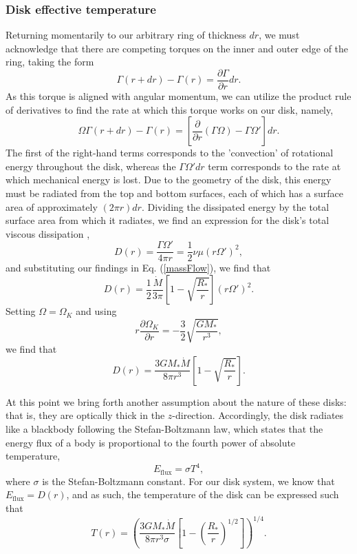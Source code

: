 \documentclass[aps,pra,twocolumn]{revtex4-1}
\begin{document}
\subsubsection{\label{section 2.2.2} Disk effective temperature}
Returning momentarily to our arbitrary ring of thickness $dr$, we must acknowledge that there are competing torques on the inner and outer edge of the ring, taking the form
\begin{equation}
\Gamma(r + dr) - \Gamma(r) = \frac{\partial \Gamma}{\partial r}dr \nonumber.
\end{equation}
As this torque is aligned with angular momentum, we can utilize the product rule of derivatives to find the rate at which this torque works on our disk, namely,
\begin{equation}
\Omega\Gamma(r + dr) - \Gamma(r) = \left[ \frac{\partial}{\partial r}(\Gamma\Omega) - \Gamma\Omega' \right]dr.
\end{equation}
The first of the right-hand terms corresponds to the 'convection' of rotational energy throughout the disk, whereas the $\Gamma\Omega' dr$ term corresponds to the rate at which mechanical energy is lost.  Due to the geometry of the disk, this energy must be radiated from the top and bottom surfaces, each of which has a surface area of approximately $(2\pi r)dr$. Dividing the dissipated energy by the total surface area from which it radiates, we find an expression for the disk's total viscous dissipation \cite{king2002},
\begin{equation}
D(r) = \frac{\Gamma \Omega'}{4\pi r}= \frac{1}{2}\nu \mu (r\Omega')^2,
\end{equation}
and substituting our findings in Eq. (\ref{massFlow}), we find that
\begin{equation}
D(r) =\frac{1}{2}\frac{\dot{M}}{3\pi}\left[ 1 - \sqrt{\frac{R_*}{r}} \right] (r\Omega')^2. \nonumber
\end{equation}
Setting $\Omega = \Omega_K$ and using
\begin{equation}
r\frac{\partial\Omega_K}{\partial r} = -\frac{3}{2}\sqrt{\frac{G M_*}{r^3}},
\end{equation}
we find that
\begin{equation}
D(r) = \frac{3GM_*\dot{M}}{8\pi r^3}\left[ 1 - \sqrt{\frac{R_*}{r}} \right].
\end{equation}

At this point we bring forth another assumption about the nature of these disks: that is, they are optically thick in the $z$-direction.  Accordingly, the disk radiates like a blackbody following the Stefan-Boltzmann law, which states that the energy flux of a body is proportional to the fourth power of absolute temperature,
\begin{equation}
E_{\text{flux}} = \sigma T^4,
\end{equation}
where $\sigma$ is the Stefan-Boltzmann constant.  For our disk system, we know that $E_\text{flux} = D(r)$, and as such, the temperature of the disk can be expressed such that \cite{armitage2011, king2002}
\begin{equation}
T(r) = \left( \frac{3GM_*\dot{M}}{8\pi r^3 \sigma}\left[ 1 - \left( \frac{R_*}{r}\right)^{1/2}\right] \right)^{1/4}.
\end{equation}
\end{document}
